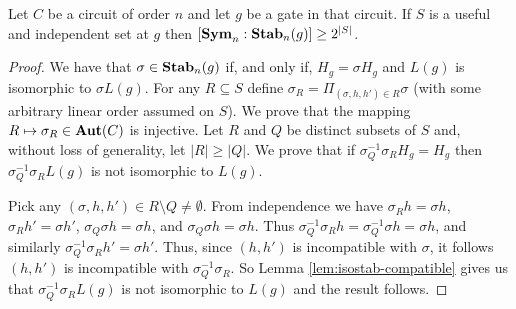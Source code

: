 \documentclass[../paper.tex]{subfiles}
\begin{document}
\begin{lem}
  \label{lem:useful-independant-set}
  Let $C$ be a circuit of order $n$ and let $g$ be a gate in that circuit. If
  $S$ is a useful and independent set at $g$ then $[\text{\textbf{Sym}}_n : \text{\textbf{Stab}}_n(g)] \geq
  2^{\vert S \vert}$.
\end{lem}
\begin{proof}
  We have that $\sigma \in \text{\textbf{Stab}}_n(g)$ if, and only if, $H_g = \sigma H_g$ and
  $L(g)$ is isomorphic to $\sigma L(g)$. For any $R \subseteq S$ define
  $\sigma_R = \Pi_{(\sigma, h, h') \in R} \sigma$ (with some arbitrary linear
  order assumed on $S$). We prove that the mapping $R \mapsto \sigma_R
  \in\text{\textbf{Aut}}(C)$ is injective. Let $R$ and $Q$ be distinct subsets of $S$ and,
  without loss of generality, let $\vert R \vert \geq \vert Q \vert$.
  We prove that if $\sigma^{-1}_Q \sigma_R H_g = H_g$ then $\sigma^{-1}_Q
  \sigma_R L(g)$ is not isomorphic to $L(g)$.

  Pick any $(\sigma, h, h') \in R \setminus Q \neq \emptyset$. From independence
  we have $\sigma_R h = \sigma h$, $\sigma_R h' = \sigma h'$, $\sigma_Q \sigma h
  = \sigma h $, and $\sigma_Q \sigma h = \sigma h$. Thus $\sigma^{-1}_Q \sigma_R
  h = \sigma^{-1}_Q \sigma h = \sigma h$, and similarly $\sigma^{-1}_Q\sigma_R
  h' = \sigma h'$. Thus, since $(h, h')$ is incompatible with $\sigma$, it
  follows $(h, h')$ is incompatible with $\sigma^{-1}_Q\sigma_R$. So Lemma
  \ref{lem:isostab-compatible} gives us that $\sigma^{-1}_Q \sigma_R L(g)$ is
  not isomorphic to $L(g)$ and the result follows.
\end{proof}

%



\end{document}
